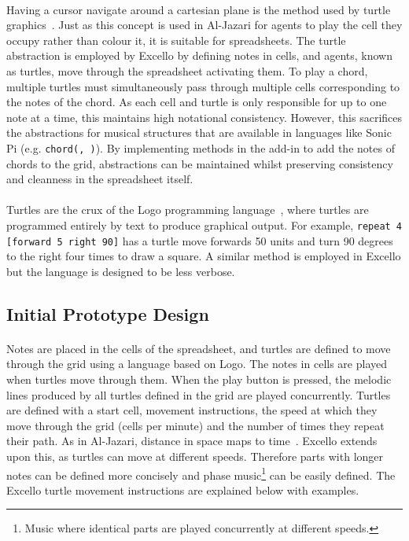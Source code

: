 \paragraph{} Having a cursor navigate around a cartesian plane is the method used by turtle graphics~\cite{papert:turtleGraphics}. Just as this concept is used in Al-Jazari for agents to play the cell they occupy rather than colour it, it is suitable for spreadsheets. The turtle abstraction is employed by Excello by defining notes in cells, and agents, known as turtles, move through the spreadsheet activating them. To play a chord, multiple turtles must simultaneously pass through multiple cells corresponding to the notes of the chord. As each cell and turtle is only responsible for up to one note at a time, this maintains high notational consistency. However, this sacrifices the abstractions for musical structures that are available in languages like Sonic Pi (e.g. \texttt{chord(, )}). By implementing methods in the add-in to add the notes of chords to the grid, abstractions can be maintained whilst preserving consistency and cleanness in the spreadsheet itself.

\paragraph{} Turtles are the crux of the Logo programming language~\cite{goldman:turtle}, where turtles are programmed entirely by text to produce graphical output. For example, \texttt{repeat 4 [forward 5 right 90]} has a turtle move forwards 50 units and turn 90 degrees to the right four times to draw a square. A similar method is employed in Excello but the language is designed to be less verbose.

\subsection{Initial Prototype Design}

\paragraph{} Notes are placed in the cells of the spreadsheet, and turtles are defined to move through the grid using a language based on Logo. The notes in cells are played when turtles move through them. When the play button is pressed, the melodic lines produced by all turtles defined in the grid are played concurrently. Turtles are defined with a start cell, movement instructions, the speed at which they move through the grid (cells per minute) and the number of times they repeat their path. As in Al-Jazari, distance in space maps to time~\cite{mclean:texture}. Excello extends upon this, as turtles can move at different speeds. Therefore parts with longer notes can be defined more concisely and phase music\footnote{Music where identical parts are played concurrently at different speeds.} can be easily defined. The Excello turtle movement instructions are explained below with examples.

